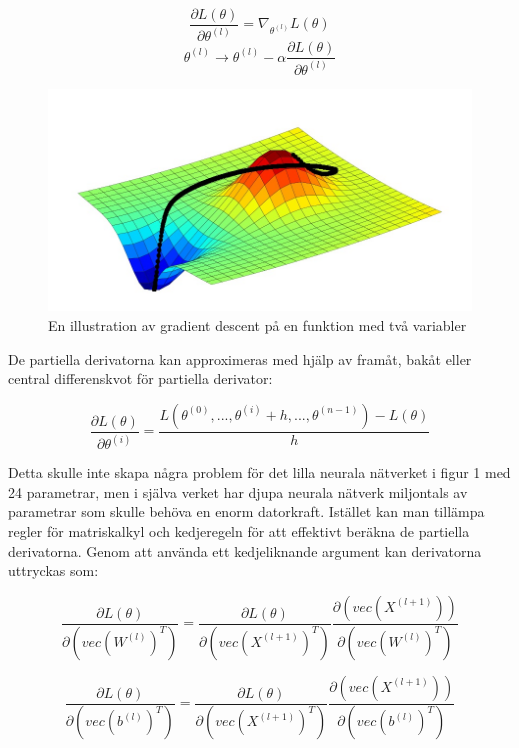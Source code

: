 \documentclass[a4paper,11pt,twoside]{article}
\newcommand*{\pd}[2]{\ensuremath{\dfrac{\partial #1}{\partial #2}}}
\begin{document}
\begin{equation}
\pd{L(\theta)}{\theta^{(l)}} = \nabla_{\theta^{(l)}} L(\theta)
\end{equation}
\begin{equation}
\theta^{(l)} \to \theta^{(l)} - \alpha \pd{L(\theta)}{\theta^{(l)}}
\end{equation}
\begin{figure}[h]\label{figSGD}
	\centering
  		\includegraphics[scale=0.5]{SGD.png}
  	\caption{En illustration av gradient descent på en funktion med två variabler \cite{figSGD}}
\end{figure}

De partiella derivatorna kan approximeras med hjälp av framåt, bakåt eller central differenskvot för partiella derivator: \cite{wikiStanford} \cite{gradient}

\begin{equation}
\pd{L(\theta)}{\theta^{(i)}} = \frac{L(\theta^{(0)},...,\theta^{(i)} + h, ..., \theta^{(n-1)})-L(\theta)}{h}
\end{equation}

Detta skulle inte skapa några problem för det lilla neurala nätverket i figur 1 med 24 parametrar, men i själva verket har djupa neurala nätverk miljontals av parametrar som skulle behöva en enorm datorkraft. Istället kan man tillämpa regler för matriskalkyl och kedjeregeln för att effektivt beräkna de partiella derivatorna. Genom att använda ett kedjeliknande argument kan derivatorna uttryckas som: \cite{cs231n} \cite{convmath}

\begin{equation}
\pd{L(\theta)}{(vec(W^{(l)})^T)} = \pd{L(\theta)}{(vec(X^{(l+1)})^T)} \pd{(vec(X^{(l+1)}))}{(vec(W^{(l)})^T)}
\end{equation}

\begin{equation}
\pd{L(\theta)}{(vec(b^{(l)})^T)} = \pd{L(\theta)}{(vec(X^{(l+1)})^T)} \pd{(vec(X^{(l+1)}))}{(vec(b^{(l)})^T)}
\end{equation}
\end{document}
